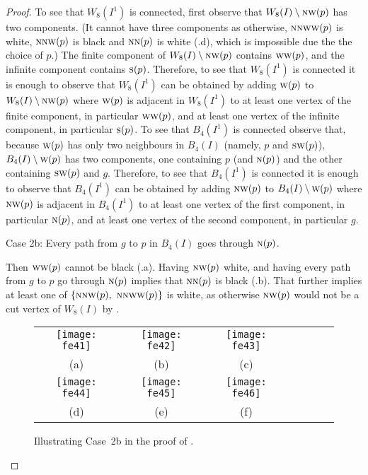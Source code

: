 \documentclass[lotsofwhite,charterfonts]{patmorin}
\newcommand{\N}{\textsc{n}}
\renewcommand{\S}{\textsc{s}}
\newcommand{\SW}{\textsc{sw}}
\newcommand{\W}{\textsc{w}}
\newcommand{\NW}{\textsc{nw}}
\newcommand{\sm}{\ensuremath{\setminus}}
\begin{document}
\begin{proof}
To see that $W_8(I^1)$ is connected, first observe that $W_8(I)\sm \NW(p)$ has two components. (It cannot have three components as otherwise,  $\N\N\W\W(p)$ is white, $\N\N\W(p)$ is black and  $\N\N(p)$ is white (.d), which  is impossible due the the choice of $p$.) The finite component of $W_8(I)\sm \NW(p)$ contains $\W\W(p)$, and the infinite component contains $\S(p)$. Therefore, to see that $W_8(I^1)$ is connected it is enough to observe that $W_8(I^1)$ can be obtained by adding $\W(p)$ to $W_8(I)\sm \NW(p)$ where $\W(p)$ is adjacent in $W_8(I^1)$ to at least one vertex of the finite component, in particular $\W\W(p)$, and at least one vertex of the infinite component, in particular $\S(p)$. To see that $B_4(I^1)$ is connected observe that, because $\W(p)$ has only two neighbours in $B_4(I)$ (namely, $p$ and $\SW(p)$), $B_4(I)\sm \W(p)$ has two components, one containing $p$ (and $\N(p)$) and the other containing $\SW(p)$ and $g$. Therefore, to see that $B_4(I^1)$ is connected it is enough to observe that $B_4(I^1)$ can be obtained by adding $\NW(p)$ to $B_4(I)\sm \W(p)$ where $\NW(p)$ is adjacent in $B_4(I^1)$ to at least one vertex of the first component, in particular $\N(p)$, and at least one vertex of the second component, in particular $g$. 


\noindent Case 2b: Every path from $g$ to $p$ in $B_4(I)$ goes through $\N(p)$. 

Then $\W\W(p)$ cannot be black (.a). Having $\NW(p)$
white, and having every path from $g$ to $p$ go through $\N(p)$
implies that $\N\N(p)$ is black (.b). That further implies
at least one of $\{\N\NW(p),\ \N\NW\W(p)\}$ is white, as otherwise
$\NW(p)$ would not be a cut vertex of $W_8(I)$ by . 

\begin{figure}[htbp]
\begin{center}
\begin{tabular}{ccccccc}
\texttt{[image: fe41]} &
\texttt{[image: fe42]} &
\texttt{[image: fe43]} \\
(a) & (b) & (c) \\ 
\texttt{[image: fe44]} &
\texttt{[image: fe45]} &
\texttt{[image: fe46]} \\
(d) & (e) & (f)
\end{tabular}
\end{center}
\caption{Illustrating Case~2b in the proof of .}
\end{figure}


\end{proof}
\end{document}
